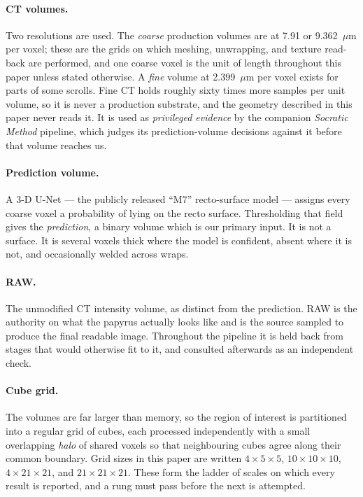 \paragraph{CT volumes.} Two resolutions are used. The \emph{coarse} production volumes are at 7.91 or 9.362~$\mu$m per voxel; these are the grids on which meshing, unwrapping, and texture read-back are performed, and one coarse voxel is the unit of length throughout this paper unless stated otherwise. A \emph{fine} volume at 2.399~$\mu$m per voxel exists for parts of some scrolls. Fine CT holds roughly sixty times more samples per unit volume, so it is never a production substrate, and the geometry described in this paper never reads it. It is used as \emph{privileged evidence} by the companion \emph{Socratic Method} pipeline, which judges its prediction-volume decisions against it before that volume reaches us.

\paragraph{Prediction volume.} A 3-D U-Net --- the publicly released ``M7'' recto-surface model --- assigns every coarse voxel a probability of lying on the recto surface. Thresholding that field gives the \emph{prediction}, a binary volume which is our primary input. It is not a surface. It is several voxels thick where the model is confident, absent where it is not, and occasionally welded across wraps.

\paragraph{RAW.} The unmodified CT intensity volume, as distinct from the prediction. RAW is the authority on what the papyrus actually looks like and is the source sampled to produce the final readable image. Throughout the pipeline it is held back from stages that would otherwise fit to it, and consulted afterwards as an independent check.

\paragraph{Cube grid.} The volumes are far larger than memory, so the region of interest is partitioned into a regular grid of cubes, each processed independently with a small overlapping \emph{halo} of shared voxels so that neighbouring cubes agree along their common boundary. Grid sizes in this paper are written $4\times5\times5$, $10\times10\times10$, $4\times21\times21$, and $21\times21\times21$. These form the ladder of scales on which every result is reported, and a rung must pass before the next is attempted.


